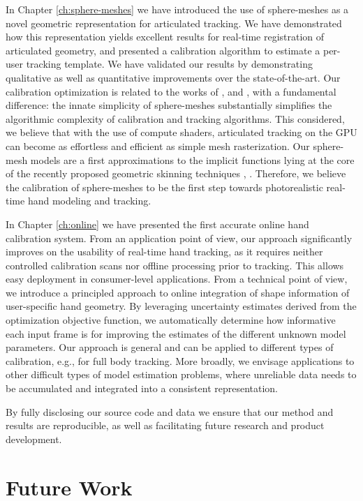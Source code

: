In Chapter \ref{ch:sphere-meshes} we have introduced the use of sphere-meshes as a novel geometric representation for articulated tracking. We have demonstrated how this representation yields excellent results for real-time registration of articulated geometry, and presented a calibration algorithm to estimate a per-user tracking template. We have validated our results by demonstrating qualitative as well as quantitative improvements over the state-of-the-art. Our calibration optimization is related to the works of \cite{taylor2014user},  \cite{khamis15learning} and  \cite{joseph2016fits}, with a fundamental difference: the innate simplicity of sphere-meshes substantially simplifies the algorithmic complexity of calibration and tracking algorithms. This considered, we believe that with the use of compute shaders, articulated tracking on the GPU can become as effortless and efficient as simple mesh rasterization. 
Our sphere-mesh models are a first approximations to the implicit functions lying at the core of the recently proposed geometric skinning techniques \cite{vaillant2013implicit},  \cite{vaillant2014robust}. Therefore, we believe the calibration of sphere-meshes to be the first step towards photorealistic real-time hand modeling and tracking.

In Chapter \ref{ch:online} we have presented the first accurate online hand calibration system. 
From an application point of view, our approach significantly improves on the usability of real-time hand tracking, as it requires neither controlled calibration scans nor offline processing prior to tracking. This allows easy deployment in consumer-level applications. From a technical point of view, we introduce a principled approach to online integration of shape information of user-specific hand geometry. By leveraging uncertainty estimates derived from the optimization objective function, we automatically determine how informative each input frame is for improving the estimates of the different unknown model parameters. Our approach is general and can be applied to different types of calibration, e.g., for full body tracking. More broadly, we envisage applications to other difficult types of model estimation problems, where unreliable data needs to be accumulated and integrated into a consistent representation.

By fully disclosing our source code and data we ensure that our method and results are reproducible, as well as facilitating future research and product development. 

\section {Future Work}

